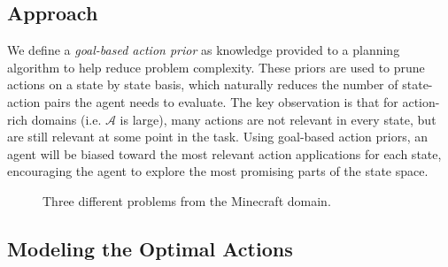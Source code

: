 \documentclass[11pt]{article}
\begin{document}
\subsection{Approach}
We define a {\it goal-based action prior} as knowledge provided to a planning algorithm to help reduce problem complexity. These priors are used to prune actions on a state by state basis, which naturally reduces the number of state-action pairs the agent needs to evaluate. The key observation is that for action-rich domains (i.e. $\mathcal{A}$ is large), many actions are not relevant in every state, but are still relevant at some point in the task. Using goal-based action priors, an agent will be biased toward the most relevant action applications for each state, encouraging the agent to explore the most promising parts of the state space.

\begin{figure}[t]
\centering
{}
  \caption{Three different problems from the Minecraft domain.}
  \label{fig:minecraft}
\end{figure}


\subsection{Modeling the Optimal Actions}
\end{document}

